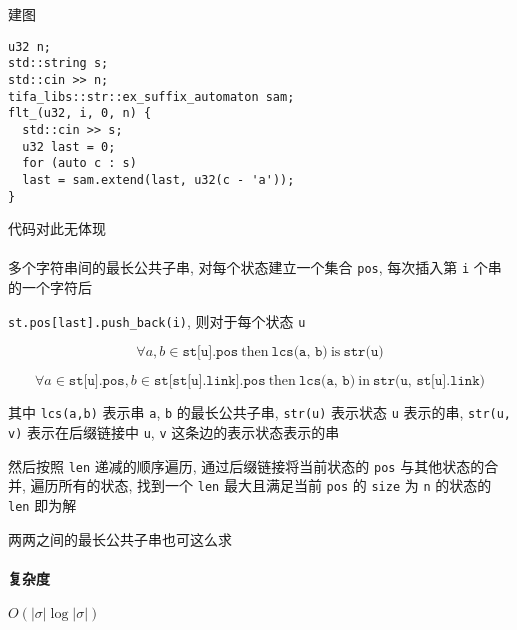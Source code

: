 建图

\begin{verbatim}
u32 n;
std::string s;
std::cin >> n;
tifa_libs::str::ex_suffix_automaton sam;
flt_(u32, i, 0, n) {
  std::cin >> s;
  u32 last = 0;
  for (auto c : s)
  last = sam.extend(last, u32(c - 'a'));
}
\end{verbatim}

代码对此无体现\\
\\

多个字符串间的最长公共子串, 对每个状态建立一个集合 \verb|pos|, 每次插入第 \verb|i| 个串的一个字符后

\verb|st.pos[last].push_back(i)|, 则对于每个状态 \verb|u|

\[
    \forall a,b \in \texttt{st[u].pos}~\text{then}~\texttt{lcs(a, b)}~\text{is}~\texttt{str(u)}
\]

\[
    \forall a\in \texttt{st[u].pos}, b\in \texttt{st[st[u].link].pos}~\text{then}~\texttt{lcs(a, b)} ~\text{in}~ \texttt{str(u, st[u].link)}
\]

其中 \verb|lcs(a,b)| 表示串 \verb|a|, \verb|b| 的最长公共子串, \verb|str(u)| 表示状态 \verb|u| 表示的串, \verb|str(u, v)| 表示在后缀链接中 \verb|u|, \verb|v| 这条边的表示状态表示的串

然后按照 \verb|len| 递减的顺序遍历, 通过后缀链接将当前状态的 \verb|pos| 与其他状态的合并, 遍历所有的状态, 找到一个 \verb|len| 最大且满足当前 \verb|pos| 的 \verb|size| 为 \verb|n| 的状态的 \verb|len| 即为解

两两之间的最长公共子串也可这么求

\paragraph{复杂度}

\(O(|\sigma| \log|\sigma|)\)
